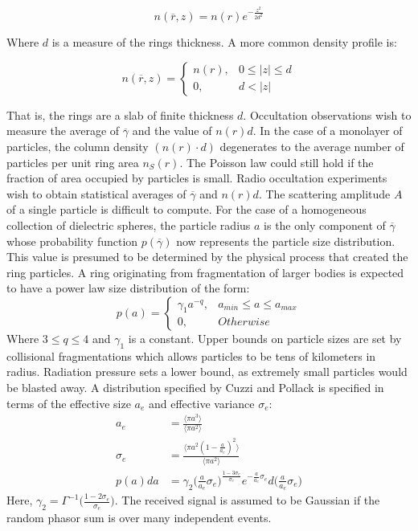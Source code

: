 \documentclass{article}
\theoremstyle{mystyle}
\begin{document}
\begin{equation}
n(\overline{r},z) = n(r)e^{-\frac{z^2}{2d^2}}
\end{equation}

Where $d$ is a measure of the rings thickness. A more common density profile is:

\begin{equation}
n(\overline{r},z) = \begin{cases} n(r), & 0\leq |z| \leq d \\ 0, & d<|z|\end{cases}
\end{equation}

That is, the rings are a slab of finite thickness $d$. Occultation observations wish to measure the average of $\overline{\gamma}$ and the value of $n(r)d$. In the case of a monolayer of particles, the column density $(n(r)\cdot d)$ degenerates to the average number of particles per unit ring area $n_{S}(r)$. The Poisson law could still hold if the fraction of area occupied by particles is small. Radio occultation experiments wish to obtain statistical averages of $\overline{\gamma}$ and $n(r)d$. The scattering amplitude $A$ of a single particle is difficult to compute. For the case of a homogeneous collection of dielectric spheres, the particle radius $a$ is the only component of $\overline{\gamma}$ whose probability function $p(\overline{\gamma})$ now represents the particle size distribution. This value is presumed to be determined by the physical process that created the ring particles. A ring originating from fragmentation of larger bodies is expected to have a power law size distribution of the form:
\begin{equation}
p(a) = \begin{cases} \gamma_{1}a^{-q}, & a_{min}\leq a \leq a_{max} \\ 0, & Otherwise\end{cases}
\end{equation}
Where $3\leq q \leq 4$ and $\gamma_{1}$ is a constant. Upper bounds on particle sizes are set by collisional fragmentations which allows particles to be tens of kilometers in radius. Radiation pressure sets a lower bound, as extremely small particles would be blasted away. A distribution specified by Cuzzi and Pollack is specified in terms of the effective size $a_{e}$ and effective variance $\sigma_{e}$:
\begin{align}
a_{e} &= \frac{\langle \pi a^3\rangle}{\langle \pi a^2\rangle}\\
\sigma_{e} &= \frac{\langle \pi a^2(1-\frac{a}{a_{e}})^2\rangle}{\langle \pi a^2\rangle}\\
p(a)da &= \gamma_{2}\bigg(\frac{a}{a_{e}}\sigma_{e}\bigg)^{\frac{1-3\sigma_{e}}{\sigma_{e}}}e^{-\frac{a}{a_{e}}\sigma_{e}}d\bigg(\frac{a}{a_{e}}\sigma_{e}\bigg)
\end{align}
Here, $\gamma_{2} = \Gamma^{-1}\big(\frac{1-2\sigma_{e}}{\sigma_{e}}\big)$. The received signal is assumed to be Gaussian if the random phasor sum is over many independent events. 
\end{document}

